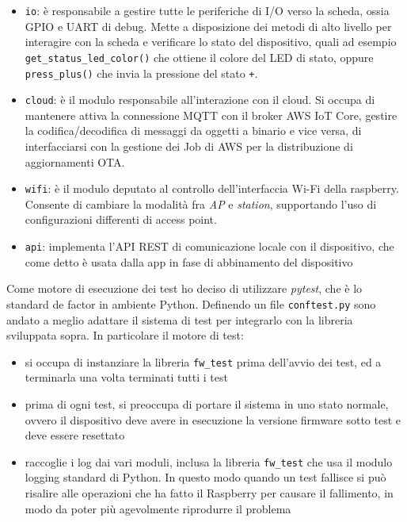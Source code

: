 \documentclass[12pt,a4paper,twoside,titlepage]{book}
\begin{document}
\begin{itemize}
    \item \texttt{io}: è responsabile a gestire tutte le periferiche di I/O
        verso la scheda, ossia GPIO e UART di debug. Mette a disposizione dei metodi di
        alto livello per interagire con la scheda e verificare lo stato del dispositivo,
        quali ad esempio \texttt{get\_status\_led\_color()} che ottiene il colore del
        LED di stato, oppure \texttt{press\_plus()} che invia la pressione del stato \texttt{+}.
    \item \texttt{cloud}: è il modulo responsabile all'interazione con il cloud. Si
        occupa di mantenere attiva la connessione MQTT con il broker AWS IoT Core,
        gestire la codifica/decodifica di messaggi da oggetti a binario e vice versa,
        di interfacciarsi con la gestione dei Job di AWS per la distribuzione di aggiornamenti
        OTA.
    \item \texttt{wifi}: è il modulo deputato al controllo dell'interfaccia Wi-Fi
        della raspberry. Consente di cambiare la modalità fra \textit{AP} e \textit{station},
        supportando l'uso di configurazioni differenti di access point.
    \item \texttt{api}: implementa l'API REST di comunicazione locale con il dispositivo,
        che come detto è usata dalla app in fase di abbinamento del dispositivo
\end{itemize}


Come motore di esecuzione dei test ho deciso di utilizzare \textit{pytest}, che
è lo standard de factor in ambiente Python. Definendo un file \texttt{conftest.py}
sono andato a meglio adattare il sistema di test per integrarlo con la libreria
sviluppata sopra. In particolare il motore di test:

\begin{itemize}
    \item si occupa di instanziare la libreria \texttt{fw\_test} prima dell'avvio
        dei test, ed a terminarla una volta terminati tutti i test
    \item prima di ogni test, si preoccupa di portare il sistema in uno stato normale,
        ovvero il dispositivo deve avere in esecuzione la versione firmware sotto test
        e deve essere resettato
    \item raccoglie i log dai vari moduli, inclusa la libreria \texttt{fw\_test} che
        usa il modulo logging standard di Python. In questo modo quando un test
        fallisce si può risalire alle operazioni che ha fatto il Raspberry per causare
        il fallimento, in modo da poter più agevolmente riprodurre il problema
\end{itemize}
\end{document}
